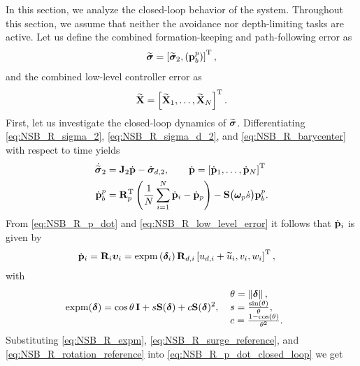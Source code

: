 In this section, we analyze the closed-loop behavior of the system.
Throughout this section, we assume that neither the avoidance nor depth-limiting tasks are active.
Let us define the combined formation-keeping and path-following error as 
\begin{equation}
    \widetilde{\bm{\sigma}} = \left[\widetilde{\bm{\sigma}}_2, \left(\mathbf{p}_b^p\right)\right]^{\mathrm{T}},
\end{equation}
and the combined low-level controller error as
\begin{equation}
    \widetilde{\mathbf{X}} = \left[\widetilde{\mathbf{X}}_1, \ldots, \widetilde{\mathbf{X}}_N\right]^{\mathrm{T}}.
\end{equation}
First, let us investigate the closed-loop dynamics of $\widetilde{\bm{\sigma}}$.
Differentiating \eqref{eq:NSB_R_sigma_2}, \eqref{eq:NSB_R_sigma_d_2}, and \eqref{eq:NSB_R_barycenter} with respect to time yields 
\begin{subequations}
\begin{align}
    \dot{\widetilde{\bm{\sigma}}}_2 &= \mathbf{J}_2\dot{\mathbf{p}} - \dot{\bm{\sigma}}_{d, 2}, \qquad \dot{\mathbf{p}} = \left[\dot{\mathbf{p}}_1, \ldots, \dot{\mathbf{p}}_N\right]^{\mathrm{T}} \\
    \dot{\mathbf{p}}_b^p &= \mathbf{R}_p^{\mathrm{T}}\left(\frac{1}{N}\sum_{i=1}^N\dot{\mathbf{p}}_i - \dot{\mathbf{p}}_p\right) - \mathbf{S}\big(\bm{\omega}_p\dot{s}\big)\mathbf{p}_b^p.
\end{align} \label{eq:NSB_R_dot_sigma_tilde}
\end{subequations}
From \eqref{eq:NSB_R_p_dot} and \eqref{eq:NSB_R_low_level_error} it follows that $\dot{\mathbf{p}}_i$ is given by 
\begin{align}
    \dot{\mathbf{p}}_i &= \mathbf{R}_i\bm{\upsilon}_i = {\rm expm}\left(\bm{\delta}_i\right)\mathbf{R}_{d, i}\left[u_{d, i} + \widetilde{u}_i, v_i, w_i\right]^{\mathrm{T}}, \label{eq:NSB_R_p_dot_closed_loop}
\end{align}
with 
\begin{align}
    {\rm expm}(\bs{\delta}) &= \cos\theta\,\mat{I} + s\mat{S}(\bs{\delta}) + c\mat{S}(\bs{\delta})^2\mathrlap{,} &
    &\begin{array}{l}
    \scale[1]{\theta = \norm{\bs{\delta}},} \\
    \scale[1]{s = \frac{\sin(\theta)}{\theta},} \\
    \scale[1]{c = \frac{1 - \cos(\theta)}{\theta^2}.}
    \end{array} \label{eq:NSB_R_expm}
\end{align}
Substituting \eqref{eq:NSB_R_expm}, \eqref{eq:NSB_R_surge_reference}, and \eqref{eq:NSB_R_rotation_reference} into \eqref{eq:NSB_R_p_dot_closed_loop} we get 
